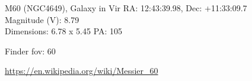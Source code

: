 \begin{block}{M60 (NGC4649), Galaxy in Vir}
    RA: 12:43:39.98, Dec: +11:33:09.7 \\ 
    Magnitude (V): 8.79 \\ 
    Dimensions: 6.78 x 5.45 PA: 105 

    Finder fov: 60 

    \url{https://en.wikipedia.org/wiki/Messier_60} 
\end{block}